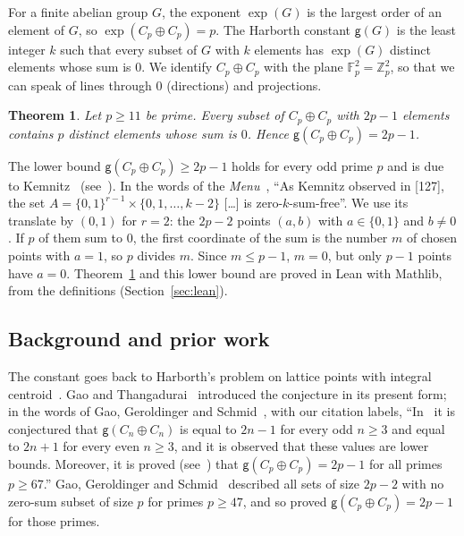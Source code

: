 \documentclass[11pt]{article}
\newtheorem{theorem}{Theorem}
\theoremstyle{remark}
\newcommand{\Z}{\mathbb{Z}}
\begin{document}
For a finite abelian group $G$, the exponent $\exp(G)$ is the largest order of an element of $G$, so $\exp(C_p\oplus C_p)=p$. The Harborth constant $\mathsf g(G)$ is the least integer $k$ such that every subset of $G$ with $k$ elements has $\exp(G)$ distinct elements whose sum is $0$. We identify $C_p\oplus C_p$ with the plane $\mathbb F_p^2=\Z_p^2$, so that we can speak of lines through $0$ (directions) and projections.

\begin{theorem}\label{thm:main}
Let $p\ge 11$ be prime. Every subset of $C_p\oplus C_p$ with $2p-1$ elements contains $p$ distinct elements whose sum is $0$. Hence $\mathsf g(C_p\oplus C_p)=2p-1$.
\end{theorem}

The lower bound $\mathsf g(C_p\oplus C_p)\ge 2p-1$ holds for every odd prime $p$ and is due to Kemnitz~\cite{Kemnitz} (see~\cite[Proposition~F.97]{Bajnok}). In the words of the \emph{Menu}~\cite[p.~301]{Bajnok}, ``As Kemnitz observed in [127], the set $A=\{0,1\}^{r-1}\times\{0,1,\dots,k-2\}$ [\dots] is zero-$k$-sum-free''. We use its translate by $(0,1)$ for $r=2$: the $2p-2$ points $(a,b)$ with $a\in\{0,1\}$ and $b\ne0$. If $p$ of them sum to $0$, the first coordinate of the sum is the number $m$ of chosen points with $a=1$, so $p$ divides $m$. Since $m\le p-1$, $m=0$, but only $p-1$ points have $a=0$. Theorem~\ref{thm:main} and this lower bound are proved in Lean with Mathlib, from the definitions (Section~\ref{sec:lean}).

\subsection{Background and prior work}

The constant goes back to Harborth's problem on lattice points with integral centroid~\cite{Harborth}. Gao and Thangadurai~\cite{GT} introduced the conjecture in its present form; in the words of Gao, Geroldinger and Schmid~\cite[Section~5]{GGS}, with our citation labels, ``In~\cite{GT} it is conjectured that $\mathsf g(C_n\oplus C_n)$ is equal to $2n-1$ for every odd $n\ge3$ and equal to $2n+1$ for every even $n\ge3$, and it is observed that these values are lower bounds. Moreover, it is proved (see~\cite[Theorem~1]{GT}) that $\mathsf g(C_p\oplus C_p)=2p-1$ for all primes $p\ge67$.'' Gao, Geroldinger and Schmid~\cite[Theorem~5.1]{GGS} described all sets of size $2p-2$ with no zero-sum subset of size $p$ for primes $p\ge47$, and so proved $\mathsf g(C_p\oplus C_p)=2p-1$ for those primes.
\end{document}
